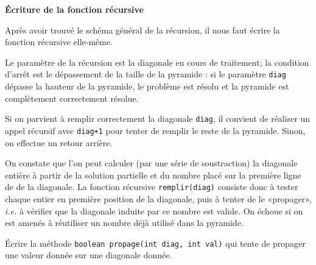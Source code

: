 \documentclass[10pt]{article}\usepackage[correction,nu]{esial}
\begin{document}
\begin{Exercice}\textbf{Écriture de la fonction récursive}
  
  \noindent Après avoir trouvé le schéma général de la récursion, il nous faut
  écrire la fonction récursive elle-même.

  Le paramètre de la récursion est la diagonale en cours de traitement; la
  condition d'arrêt est le dépassement de la taille de la pyramide : si le
  paramètre \texttt{diag} dépasse la hauteur de la pyramide, le problème est
  résolu et la pyramide est complètement correctement résolue.

  Si on parvient à remplir correctement la diagonale \texttt{diag}, il convient
  de réaliser un appel récursif avec \texttt{diag+1} pour tenter de remplir le
  reste de la pyramide. Sinon, on effectue un retour arrière.

  On constate que l'on peut calculer (par une série de soustraction) la
  diagonale entière à partir de la solution partielle et du nombre placé sur la
  première ligne de de la diagonale. La fonction récursive
  \texttt{remplir(diag)} consiste donc à tester chaque entier en première
  position de la diagonale, puis à tenter de le «propager», \textit{i.e.} à
  vérifier que la diagonale induite par ce nombre est valide. On échoue si on
  est amenés à réutiliser un nombre déjà utilisé dans la pyramide.
\end{Exercice}
\begin{Question}
  Écrire la méthode \texttt{boolean propage(int diag, int val)} qui tente de
  propager une valeur donnée sur une diagonale donnée.
\end{Question}
\end{document}
